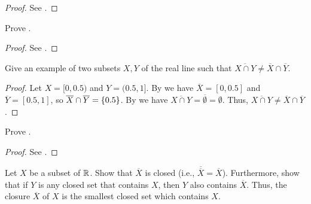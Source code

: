 \begin{proof}
  See .
\end{proof}

\begin{ex}\label{i:ex:9.1.3}
  Prove .
\end{ex}

\begin{proof}
  See .
\end{proof}

\begin{ex}\label{i:ex:9.1.4}
  Give an example of two subsets \(X, Y\) of the real line such that \(\overline{X \cap Y} \neq \overline{X} \cap \overline{Y}\).
\end{ex}

\begin{proof}
  Let \(X = [0, 0.5)\) and \(Y = (0.5, 1]\).
  By  we have \(\overline{X} = [0, 0.5]\) and \(\overline{Y} = [0.5, 1]\), so \(\overline{X} \cap \overline{Y} = \left\lbrace0.5\right\rbrace\).
  By  we have \(\overline{X \cap Y} = \overline{\emptyset} = \emptyset\).
  Thus, \(\overline{X \cap Y} \neq \overline{X} \cap \overline{Y}\).
\end{proof}

\begin{ex}\label{i:ex:9.1.5}
  Prove .
\end{ex}

\begin{proof}
  See .
\end{proof}

\begin{ex}\label{i:ex:9.1.6}
  Let \(X\) be a subset of \(\mathbb{R}\).
  Show that \(\overline{X}\) is closed (i.e., \(\overline{\overline{X}} = \overline{X}\)).
  Furthermore, show that if \(Y\) is any closed set that contains \(X\), then \(Y\) also contains \(\overline{X}\).
  Thus, the closure \(\overline{X}\) of \(X\) is the smallest closed set which contains \(X\).
\end{ex}

